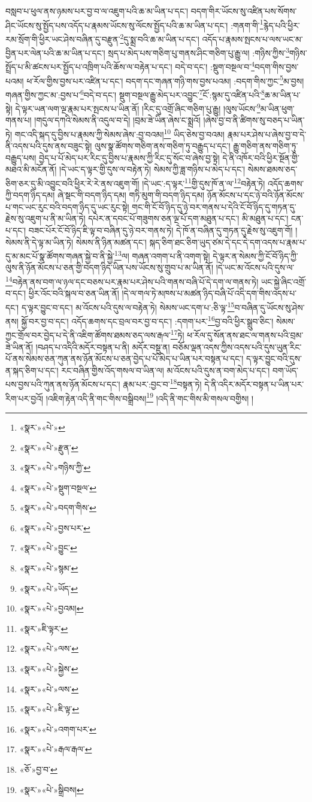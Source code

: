 བསླབ་པ་ཕུལ་ནས་ཉམས་པར་བྱ་བ་ལ་འཇུག་པའི་ཆ་མ་ཡིན་པ་དང་། བདག་གིར་ཡོངས་སུ་འཛིན་པས་སོགས་ཤིང་ཡོངས་སུ་སྤྱོད་པས་འདོད་པ་རྣམས་ཡོངས་སུ་ལོངས་སྤྱོད་པའི་ཆ་མ་ཡིན་པ་དང་། :གནག་གི་\footnote{«སྣར་»«པེ་»}རྙེད་པའི་ཕྱིར་རམ་སྲོག་གི་ཕྱིར་ཡང་ཤེས་བཞིན་དུ་བརྫུན་\footnote{«སྣར་»«པེ་»རྫུན་}དུ་སྨྲ་བའི་ཆ་མ་ཡིན་པ་དང་། འདོད་པ་རྣམས་སྤངས་པ་ལས་ཡང་མ་བྱིན་པར་ལེན་པའི་ཆ་མ་ཡིན་པ་དང་། སྲད་པ་མེད་པས་གཅིག་པུ་གནས་ཤིང་གཅིག་པུ་རྒྱུ་ལ། :གཉིས་ཀྱིས་\footnote{«སྣར་»«པེ་»གཉིས་ཀྱི་}གཉིས་སྤྲོད་པ་མི་ཚངས་པར་སྤྱོད་པ་འཁྲིག་པའི་ཆོས་ལ་བརྟེན་པ་དང་། བདེ་བ་དང་། :སྡུག་བསྔལ་བ་\footnote{«སྣར་»«པེ་»སྡུག་བསྔལ་}བདག་གིས་བྱས་པའམ། ཕ་རོལ་གྱིས་བྱས་པར་འཛིན་པ་དང་། བདག་དང་གཞན་གཉི་གས་བྱས་པའམ། :བདག་གིས་ཀྱང་\footnote{«སྣར་»«པེ་»བདག་གིས་}མ་བྱས། གཞན་གྱིས་ཀྱང་མ་:བྱས་པ་\footnote{«སྣར་»«པེ་»བྱས་པར་}བདེ་བ་དང་། སྡུག་བསྔལ་རྒྱུ་མེད་པར་འབྱུང་\footnote{«སྣར་»«པེ་»བྱུང་}ངོ་:སྙམ་དུ་འཛིན་པའི་\footnote{«སྣར་»«པེ་»སྙམ་}ཆ་མ་ཡིན་པ་སྟེ། དེ་ལྟར་ཡན་ལག་ལྔ་རྣམ་པར་སྤངས་པ་ཡིན་ནོ། །རིང་དུ་འགྲོ་ཞིང་གཅིག་པུ་རྒྱུ། །ལུས་ཡོངས་\footnote{«སྣར་»«པེ་»ཡོད་}མ་ཡིན་ཕུག་གནས་པ། །གདུལ་དཀའི་སེམས་ནི་འདུལ་བ་དེ། །བྲམ་ཟེ་ཡིན་ཞེས་ང་སྨྲའོ། །ཞེས་བྱ་བ་ནི་ཚིགས་སུ་བཅད་པ་ཡིན་ཏེ། གང་འདི་སྐད་དུ་བྱིས་པ་རྣམས་ཀྱི་སེམས་ཞེས་:བྱ་བའམ།\footnote{«སྣར་»«པེ་»བྱའམ།} ཡིད་ཅེས་བྱ་བའམ། རྣམ་པར་ཤེས་པ་ཞེས་བྱ་བ་དེ་ནི་འདས་པའི་དུས་ནས་བཟུང་སྟེ། ལུས་སྣ་ཚོགས་གཅིག་ནས་གཅིག་ཏུ་བརྒྱུད་པ་དང་། རྒྱུ་གཅིག་ནས་གཅིག་ཏུ་བརྒྱུད་པས། བྱེད་པ་པོ་མེད་པར་རིང་དུ་བྱིས་པ་རྣམས་ཀྱི་རིང་དུ་སོང་བ་ཞེས་བྱ་སྟེ། དེ་ནི་འཁོར་བའི་ཕྱིར་སྔོན་གྱི་མཐའ་མི་མངོན་ནོ། །དེ་ཡང་ད་ལྟར་གྱི་དུས་ལ་བརྟེན་ཏེ། སེམས་ཀྱི་ཟླ་གཉིས་པ་མེད་པ་དང་། སེམས་ཐམས་ཅད་ཅིག་ཅར་དུ་མི་འབྱུང་བའི་ཕྱིར་རེ་རེ་ནས་འཇུག་གོ། །དེ་ཡང་:ད་ལྟར་\footnote{«སྣར་»ཇི་ལྟར་}གྱི་དུས་ཁོ་ན་ལ་\footnote{«སྣར་»«པེ་»ལས་}བརྟེན་ཏེ། འདོད་ཆགས་ཀྱི་བདག་ཉིད་དམ། ཞེ་སྡང་གི་བདག་ཉིད་དམ། གཏི་མུག་གི་བདག་ཉིད་དམ། ཉོན་མོངས་པ་དང་ཉེ་བའི་ཉོན་མོངས་པ་གང་ཡང་རུང་བའི་བདག་ཉིད་དུ་ཡང་རུང་སྟེ། གང་གི་ངོ་བོ་ཉིད་དུ་ཉེ་བར་གནས་པ་དེའི་ངོ་བོ་ཉིད་དུ་གཏན་དུ་རྗེས་སུ་འཇུག་པ་ནི་མ་ཡིན་ཏེ། དཔེར་ན་དབང་པོ་གཟུགས་ཅན་ལྔ་པོ་དག་མཐུན་པ་དང་། མི་མཐུན་པ་དང་། ངན་པ་དང་། བཟང་པོར་ངོ་བོ་ཉིད་ཇི་ལྟ་བ་བཞིན་དུ་ཉེ་བར་གནས་ཏེ། དེ་ཁོ་ན་བཞིན་དུ་གཏན་དུ་རྗེས་སུ་འཇུག་གོ། །སེམས་ནི་དེ་ལྟ་མ་ཡིན་ཏེ། སེམས་ནི་ཉིན་མཚན་དང་། སྐད་ཅིག་ཐང་ཅིག་ཡུད་ཙམ་དེ་དང་དེ་དག་འདས་པ་རྣམ་པ་དུ་མ་མང་པོ་སྣ་ཚོགས་གཞན་སྐྱེ་བ་ནི་སྐྱེ་\footnote{«སྣར་»«པེ་»སྐྱེས་}ལ། གཞན་འགག་པ་ནི་འགག་སྟེ། དེ་ལྟར་ན་སེམས་ཀྱི་ངོ་བོ་ཉིད་ཀྱི་ལུས་ནི་ཉོན་མོངས་པ་ཅན་གྱི་བདག་ཉིད་ཡིན་པས་ཡོངས་སུ་གྲུབ་པ་མ་ཡིན་ནོ། །དེ་ཡང་མ་འོངས་པའི་དུས་ལ་\footnote{«སྣར་»«པེ་»ལས་}བརྟེན་ནས་བག་ལ་ཉལ་དང་བཅས་པར་རྣམ་པར་ཤེས་པའི་གནས་བཞི་པོ་དེ་དག་ལ་གནས་ཏེ། ཡང་སྐྱེ་ཞིང་འགྲོ་བ་དང་། ཕྱིར་འོང་བའི་སྐལ་བ་ཅན་ཡིན་ནོ། །དེ་ལ་གལ་ཏེ་མཁས་པ་མཚན་ཉིད་བཞི་པོ་འདི་དག་གིས་འདས་པ་དང་། ད་ལྟར་བྱུང་བ་དང་། མ་འོངས་པའི་དུས་ལ་བརྟེན་ཏེ། སེམས་ཡང་དག་པ་:ཅི་ལྟ་\footnote{«སྣར་»«པེ་»ཇི་ལྟ་}བ་བཞིན་དུ་ཡོངས་སུ་ཤེས་ནས། སྐྱོ་བར་བྱ་བ་དང་། འདོད་ཆགས་དང་བྲལ་བར་བྱ་བ་དང་། :དགག་པར་\footnote{«སྣར་»«པེ་»འགག་པར་}བྱ་བའི་ཕྱིར་སྒྲུབ་ཅིང་། སེམས་ཀྱང་གྲོལ་བར་བྱེད་པ་དེ་ནི་འཇིག་ཚོགས་ཐམས་ཅད་ལས་རྒལ་\footnote{«སྣར་»«པེ་»རྒལ་རྒལ་}ཏེ། ཕ་རོལ་དུ་སོན་ནས་ཐང་ལ་གནས་པའི་བྲམ་ཟེ་ཡིན་ནོ། །བཤད་པ་འདིའི་མདོར་བསྟན་པ་ནི། མདོར་བསྡུ་ན། བཅོམ་ལྡན་འདས་ཀྱིས་འདས་པའི་དུས་ཡུན་རིང་པོ་ནས་སེམས་ཅན་ཀུན་ནས་ཉོན་མོངས་པ་ཅན་བྱེད་པ་པོ་མེད་པ་ཡིན་པར་བསྟན་པ་དང་། ད་ལྟར་བྱུང་བའི་དུས་ན་སྐད་ཅིག་པ་དང་། རང་བཞིན་གྱིས་འོད་གསལ་བ་ཡིན་ལ། མ་འོངས་པའི་དུས་ན་བག་མེད་པ་དང་། བག་ཡོད་པས་བྱས་པའི་ཀུན་ནས་ཉོན་མོངས་པ་དང་། རྣམ་པར་:བྱང་བ་\footnote{«ཅོ་»བྱ་བ་}བསྟན་ཏེ། དེ་ནི་འདིར་མདོར་བསྟན་པ་ཡིན་པར་རིག་པར་བྱའོ། །འཇིག་རྟེན་འདི་ནི་གང་གིས་བསྒྲིབས།\footnote{«སྣར་»«པེ་»སྒྲིབས།} །འདི་ནི་གང་གིས་མི་གསལ་བགྱིས། །
